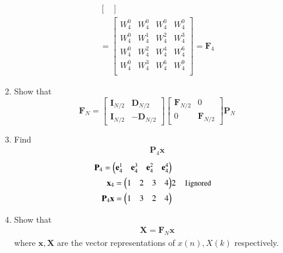 \documentclass[journal,12pt,twocolumn]{IEEEtran}
\let\vec\mathbf
\renewcommand\thesection{\arabic{section}}
\begin{document}
\begin{enumerate}[label=\arabic*.,ref=\thesection.\theenumi]
\begin{align}
\begin{bmatrix}
	\end{bmatrix}\\
	=\begin{bmatrix}
		W_{4}^0	&	W_{4}^0	&	W_{4}^0	&	W_{4}^0\\
		W_{4}^0	&	W_{4}^1	&	W_{4}^2	&	W_{4}^3\\
		W_{4}^0	&	W_{4}^2	&	W_{4}^4	&	W_{4}^6\\
		W_{4}^0	&	W_{4}^3	&	W_{4}^6	&	W_{4}^9\\
	\end{bmatrix} = \vec{F}_{4}
\end{align}
\item Show that 
\begin{equation}
	\vec{F}_{N}=
	\begin{bmatrix}
		\vec{I}_{N/2} & \vec{D}_{N/2} \\
		\vec{I}_{N/2} & -\vec{D}_{N/2}
	\end{bmatrix}
	\begin{bmatrix}
		\vec{F}_{N/2} & 0 \\
		0 & \vec{F}_{N/2}
	\end{bmatrix}
	\vec{P}_{N}
\end{equation}
\item Find 
\begin{align}
	\vec{P}_4 \vec{x}
\end{align}
	\solution
\begin{align}
	\vec{P}_{4} = \myvec{\vec{e}_4^{1} &\vec{e}_4^{3} &\vec{e}_4^{2}	&\vec{e}_4^{4}}\\
	\vec{x}_4 = \myvec{1 & 2 & 3 & 4} & 2 & 1 & \text{\small ignored}\\
	\vec{P}_{4}	\vec{x} = \myvec{1 & 3 & 2 & 4}
\end{align}

\item Show that 
\begin{align}
	\vec{X} = \vec{F}_N \vec{x}
	\label{eq:dft-mat-def}
\end{align}
where $\vec{x}, \vec{X}$ are the vector representations of $x(n), X(k)$ respectively.
\solution


\end{enumerate}
\end{document}

